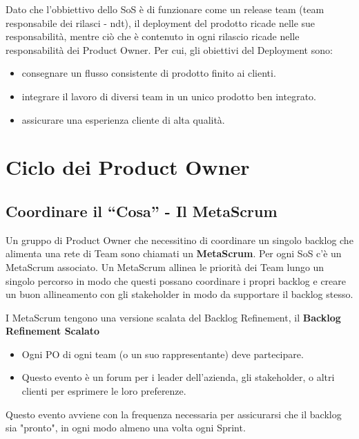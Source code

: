 \documentclass[12pt,a4paper,parskip=full]{scrartcl}
\begin{document}
Dato che l'obbiettivo dello SoS è di funzionare come un release team (team responsabile dei rilasci - ndt), il deployment del prodotto ricade nelle sue responsabilità, mentre ciò che è contenuto in ogni rilascio ricade nelle responsabilità dei Product Owner. Per cui, gli obiettivi del Deployment sono:
\begin{itemize}
\item consegnare un flusso consistente di prodotto finito ai clienti.
\item integrare il lavoro di diversi team in un unico prodotto ben integrato.
\item assicurare una esperienza cliente di alta qualità.
\end{itemize}

\section{Ciclo dei Product Owner}
\subsection{Coordinare il ``Cosa'' - Il MetaScrum}
Un gruppo di Product Owner che necessitino di coordinare un singolo backlog che alimenta una rete di Team sono chiamati un \textbf{MetaScrum}. Per ogni SoS c'è un MetaScrum associato. Un MetaScrum allinea le priorità dei Team lungo un singolo percorso in modo che questi possano coordinare i propri backlog e creare un buon allineamento con gli stakeholder in modo da supportare il backlog stesso.

I MetaScrum tengono una versione scalata del Backlog Refinement, il \textbf{Backlog Refinement Scalato} 
\begin{itemize}
\item Ogni PO di ogni team (o un suo rappresentante) deve partecipare.
\item Questo evento è un forum per i leader dell'azienda, gli stakeholder, o altri clienti per esprimere le loro preferenze.
\end{itemize}
Questo evento avviene con la frequenza necessaria per assicurarsi che il backlog sia "pronto", in ogni modo almeno una volta ogni Sprint.
\end{document}
